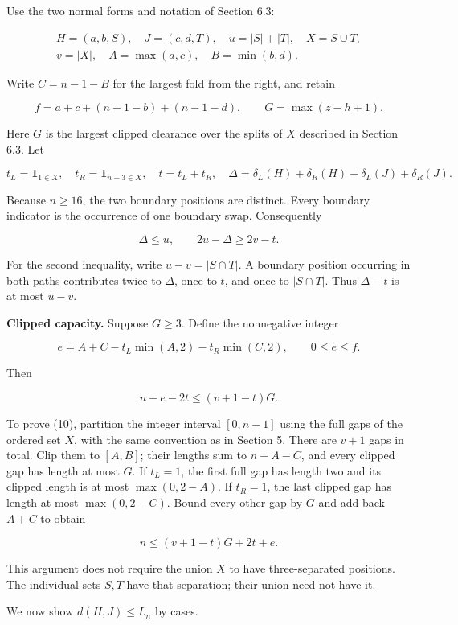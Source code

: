 \documentclass[11pt,a4paper]{article}
\begin{document}
Use the two normal forms and notation of Section 6.3:

\[
\begin{gathered}
H=(a,b,S),\quad J=(c,d,T),\quad u=|S|+|T|,\quad X=S\cup T,\\
v=|X|,\quad A=\max(a,c),\quad B=\min(b,d).
\end{gathered}
\]

Write \(C=n-1-B\) for the largest fold from the right, and retain

\[ f=a+c+(n-1-b)+(n-1-d),\qquad G=\max(z-h+1). \]

Here \(G\) is the largest clipped clearance over the splits of \(X\) described in Section 6.3. Let

\[ t_L=\mathbf1_{1\in X},\quad t_R=\mathbf1_{n-3\in X},\quad t=t_L+t_R,
\quad \Delta=\delta_L(H)+\delta_R(H)+\delta_L(J)+\delta_R(J). \]

Because \(n\ge16\), the two boundary positions are distinct. Every boundary indicator is the occurrence of one boundary swap. Consequently

\[ \Delta\le u,\qquad 2u-\Delta\ge2v-t. \tag{9} \]

For the second inequality, write \(u-v=|S\cap T|\). A boundary position occurring in both paths contributes twice to \(\Delta\), once to \(t\), and once to \(|S\cap T|\). Thus \(\Delta-t\) is at most \(u-v\).

\textbf{Clipped capacity.} Suppose \(G\ge3\). Define the nonnegative integer

\[ e=A+C-t_L\min(A,2)-t_R\min(C,2),\qquad 0\le e\le f. \]

Then

\[ n-e-2t\le(v+1-t)G. \tag{10} \]

To prove (10), partition the integer interval \([0,n-1]\) using the full gaps of the ordered set \(X\), with the same convention as in Section 5. There are \(v+1\) gaps in total. Clip them to \([A,B]\); their lengths sum to \(n-A-C\), and every clipped gap has length at most \(G\). If \(t_L=1\), the first full gap has length two and its clipped length is at most \(\max(0,2-A)\). If \(t_R=1\), the last clipped gap has length at most \(\max(0,2-C)\). Bound every other gap by \(G\) and add back \(A+C\) to obtain

\[ n\le(v+1-t)G+2t+e. \]

This argument does not require the union \(X\) to have three-separated positions. The individual sets \(S,T\) have that separation; their union need not have it.

We now show \(d(H,J)\le L_n\) by cases.
\end{document}
